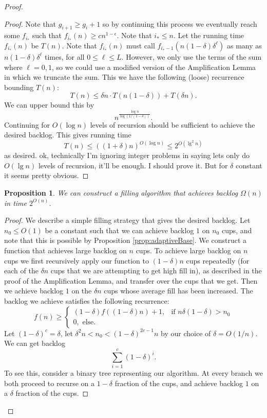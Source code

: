 \documentclass[twocolumn]{article}[10pt]
\newtheorem{proposition}{Proposition}
\begin{document}
\begin{proof}
\begin{proof}
  Note that $g_{i+1} \ge g_i + 1$ so by continuing this process we eventually
  reach some $f_{i_*}$ such that $f_{i_*}(n) \ge cn^{1-\epsilon}$.
  Note that $i_* \le n$.
  Let the running time $f_{i_*}(n)$ be $T(n)$.
  Note that $f_{i_*}(n)$ must call $f_{i_*-1}(n(1-\delta)\delta^\ell)$ as many
  as $n(1-\delta)\delta^\ell$ times, for all $0 \le \ell\le L$. However, we
  only use the terms of the sum where $\ell=0,1$, so we could use a modified
  version of the Amplification Lemma in which we truncate the sum.
  This we have the following (loose) recurrence bounding $T(n)$:
  $$T(n) \le \delta n \cdot T(n(1-\delta)) + T(\delta n).$$
  We can upper bound this by
  $$n^{\frac{\log n}{\log (1/(1-\delta))}}.$$
  Continuing for $O(\log n)$ levels of recursion should be sufficient to
  achieve the desired backlog. This gives running time
  $$T(n) \le ((1+\delta) n)^{O(\log n)} \le 2^{O(\lg^2 n)}$$
  as desired.
  {\color{red} ok, technically I'm ignoring integer problems in saying lets
  only do $O(\lg n)$ levels of recursion, it'll be enough. I should prove it.
But for $\delta$ constant it seems pretty obvious.}
    
  \end{proof}

  \begin{proposition}
    We can construct a filling algorithm that achieves backlog $\Omega(n)$ in
    time $2^{O(n)}$.
  \end{proposition}
  \begin{proof}
  We describe a simple filling strategy that gives the desired backlog. Let
  $n_0 \le O(1)$ be a constant such that we can achieve backlog $1$ on $n_0$
  cups, and note that this is possible by Proposition \ref{prop:adaptiveBase}.
  We construct a function that achieves large backlog on $n$ cups.
  To achieve large backlog on $n$ cups we first recursively apply our function to
  $(1-\delta)n$ cups repeatedly (for each of the $\delta n$ cups that we are
  attempting to get high fill in), as described in the proof of the
  Amplification Lemma, and transfer over the cups that we get. Then we achieve backlog $1$ on
  the $\delta n$ cups whose average fill has been increased. The backlog we
  achieve satisfies the following recurrence:
  $$f(n) \ge \begin{cases}
    (1-\delta)f((1-\delta)n) + 1, & \text{if } n\delta(1-\delta) > n_0\\
    0, \text{ else.}
  \end{cases}$$
  Let $(1-\delta)^c = \delta$, let $\delta^2 n < n_0 < (1-\delta)^{2c-1} n$ by
  our choice of $\delta = O(1/n)$.
    We can get backlog 
    $$\sum_{i=1}^c (1-\delta)^i. $$
    To see this, consider a binary tree representing our algorithm. At every
    branch we both proceed to recurse on a $1-\delta$ fraction of the cups, and
    achieve backlog $1$ on a $\delta$ fraction of the cups.


\end{proof}
\end{proof}
\end{document}
